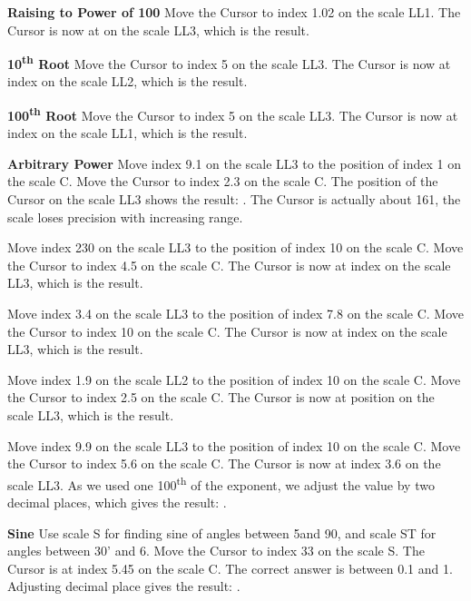 \begin{multicols*}{3}
{  \textbf{Raising to Power of 100} 
Move the Cursor to index 1.02 on the scale LL1.
The Cursor is now at  on the scale LL3, which is the result.

  \textbf{10\textsuperscript{th} Root} 
Move the Cursor to index 5 on the scale LL3.
The Cursor is now at index  on the scale LL2, which is the result.

  \textbf{100\textsuperscript{th} Root}
Move the Cursor to index 5 on the scale LL3.
The Cursor is now at index  on the scale LL1, which is the result.

  \textbf{Arbitrary Power} 
Move index 9.1 on the scale LL3 to the position of index 1 on the scale C.
Move the Cursor to index 2.3 on the scale C.
The position of the Cursor on the scale LL3 shows the result: . The Cursor is actually about 161, the scale loses precision with increasing range. 

Move index 230 on the scale LL3 to the position of index 10 on the scale C.
Move the Cursor to index 4.5 on the scale C.
The Cursor is now at index  on the scale LL3, which is the result.

Move index 3.4 on the scale LL3 to the position of index 7.8 on the scale C.
Move the Cursor to index 10 on the scale C.
The Cursor is now at index  on the scale LL3, which is the result.

Move index 1.9 on the scale LL2 to the position of index 10 on the scale C.
Move the Cursor to index 2.5 on the scale C.
The Cursor is now at position  on the scale LL3, which is the result.

Move index 9.9 on the scale LL3 to the position of index 10 on the scale C.
Move the Cursor to index 5.6 on the scale C.
The Cursor is now at index 3.6 on the scale LL3.
As we used one 100\textsuperscript{th} of the exponent, we adjust the value by two decimal places, which gives the result: .

  \textbf{Sine}
\footnotesize Use scale S for finding sine of angles between 5\textdegree and 90\textdegree, and scale ST for angles between 30' and 6\textdegree. \normalsize
{}
Move the Cursor to index 33 on the scale S.
The Cursor is at index 5.45 on the scale C.
The correct answer is between 0.1 and 1. Adjusting decimal place gives the result: .

}
\end{multicols*}
